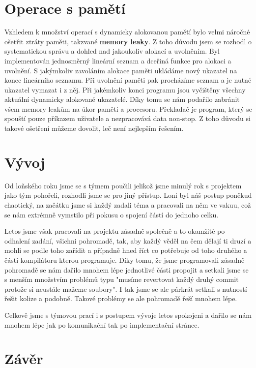 \documentclass[11pt, a4paper]{article}
\begin{document}
\section{Operace s pamětí}

Vzhledem k množství operací s dynamicky alokovanou pamětí bylo velmi náročné ošetřit ztráty paměti, takzvané \textbf{memory leaky}. Z toho důvodu jsem se rozhodl o systematickou správu a dohled nad jakoukoliv alokací a uvolněním. Byl implementován jednosměrný lineární seznam a dceřiná funkce pro alokaci a uvolnění. S jakýmkoliv zavoláním alokace paměti ukládáme nový ukazatel na konec lineárního seznamu. Při uvolnění paměti pak procházíme seznam a je nutné ukazatel vymazat i z něj. Při jakémkoliv konci programu jsou vyčištěny všechny aktuální dynamicky alokované ukazatelé. Díky tomu se nám podařilo zabránit všem memory leakům na úkor paměti a procesoru. Překladač je program, který se spouští pouze příkazem uživatele a nezpracovává data non-stop. Z toho důvodu si takové ošetření můžeme dovolit, leč není nejlepším řešením.

\section{Vývoj}

Od loňského roku jsme se s týmem poučili jelikož jsme minulý rok s projektem jako tým pohořeli, rozhodli jsme se pro jiný přístup. Loni byl náš postup poněkud chaotický, na začátku jsme si každý zadali téma a pracovali na něm ve vakuu, což se nám extrémně vymstilo při pokusu o spojení částí do jednoho celku.

Letos jsme však pracovali na projektu zásadně společně a to okamžitě po odhalení zadání, všichni pohromadě, tak, aby každý věděl na čem dělají ti druzí a mohli se podle toho zařídit a případně hned říct co potřebuje od toho druhého a části kompilátoru kterou programuje. Díky tomu, že jsme programovali zásadně pohromadě se nám dařilo mnohem lépe jednotlivé části propojit a setkali jsme se s menším množstvím problémů typu "musíme revertovat každý druhý commit protože si neustále mažeme soubory". I tak jsme se ale párkrát setkali s nutností řešit kolize a podobně. Takové problémy se ale pohromadě řeší mnohem lépe.

Celkově jsme s týmovou prací i s postupem vývoje letos spokojeni a dařilo se nám mnohem lépe jak po komunikační tak po implementační stránce.

\section{Závěr}
\end{document}
